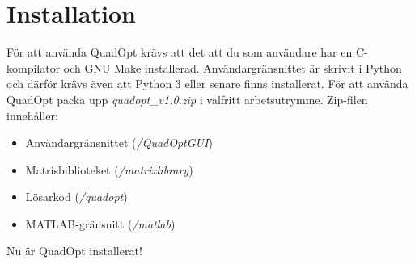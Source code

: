 \section{Installation}
För att använda QuadOpt krävs att det att du som användare har en C-kompilator och GNU Make installerad. Användargränsnittet är skrivit i Python och därför krävs även att Python 3 eller senare finns installerat.
\newline
\newline
För att använda QuadOpt packa upp \emph{quadopt\_v1.0.zip} i valfritt arbetsutrymme. Zip-filen innehåller:
\begin{itemize}
  \item Användargränsnittet (\emph{/QuadOptGUI})
  \item Matrisbiblioteket (\emph{/matrixlibrary})
  \item Lösarkod (\emph{/quadopt})
  \item MATLAB-gränsnitt (\emph{/matlab}) 
\end{itemize}
Nu är QuadOpt installerat!
